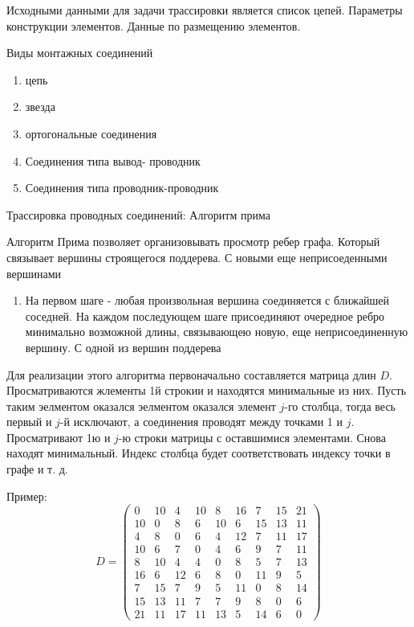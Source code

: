 \documentclass{article}
\begin{document}
	Исходными данными для задачи трассировки является список цепей. Параметры конструкции элементов. Данные по размещению элементов.

	Виды монтажных соединений
	\begin{enumerate}
		\item цепь
		\item звезда
		\item ортогональные соединения
		\item Соединения типа вывод- проводник
		\item Соединения типа проводник-проводник
	\end{enumerate}

	Трассировка проводных соединений: Алгоритм прима

	Алгоритм Прима позволяет организовывать просмотр ребер графа. Который связывает вершины строящегося поддерева. С новыми еще неприсоеденными вершинами
	
	\begin{enumerate}
		\item На первом шаге - любая произвольная вершина соединяется с ближайшей соседней. На каждом последующем шаге присоединяют очередное ребро минимально возможной длины, связывающею новую, еще неприсоединенную вершину. С одной из вершин поддерева
	\end{enumerate}

	Для реализации этого алгоритма первоначально составляется матрица длин $D$. Просматриваются жлементы 1й строкии и находятся минимальные из них. Пусть таким эелментом оказался эелментом оказался элемент $j$-го столбца, тогда весь первый и $j$-й исключают, а соединения проводят между точками 1 и $j$. Просматривают 1ю и $j$-ю строки матрицы с оставшимися элементами. Снова находят минимальный. Индекс столбца будет соответствовать индексу точки в графе и т. д.

	Пример:
	$$
	D =
	\begin{pmatrix}
		0 & 10 & 4 & 10 & 8 & 16 & 7 & 15 & 21\\
		10 & 0 & 8 & 6 & 10 & 6 & 15 & 13 & 11\\
		4 & 8 & 0 & 6 & 4 & 12 & 7 & 11 & 17\\
		10 & 6 & 7 & 0 & 4 & 6 & 9 & 7 & 11\\
		8 & 10 & 4 & 4 & 0 & 8 & 5 & 7 & 13\\
		16 & 6 & 12 & 6 & 8 & 0 & 11 & 9 & 5\\
		7 & 15 & 7 & 9 & 5 & 11 & 0 & 8 & 14\\
		15 & 13 & 11 & 7 & 7 & 9 &8 & 0 & 6\\
		21 & 11 & 17 & 11 & 13 & 5 & 14 & 6 & 0
	\end{pmatrix}
	$$
\end{document}
